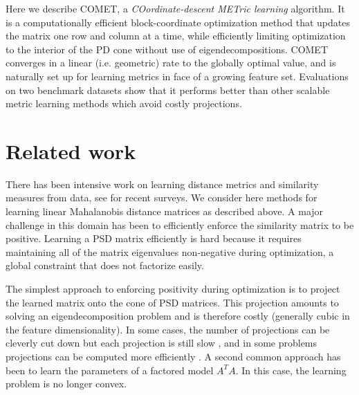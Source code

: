 \documentclass{article}
\begin{document}

Here we describe COMET, a {\em{COordinate-descent METric learning}} algorithm. It is a computationally efficient block-coordinate optimization method that updates the matrix one row and column at a time, while efficiently limiting optimization to the interior of the PD cone without use of eigendecompositions. COMET converges in a linear (i.e. geometric) rate to the globally optimal value, and is naturally set up for learning metrics in face of a growing feature set. Evaluations on two benchmark datasets show that it performs better than other scalable metric learning methods which avoid costly projections. 



\section{Related work}
There has been intensive work on learning distance metrics and similarity measures from data, see \citet{bellet2013survey, kulis2012survey} for recent surveys. We consider here methods for learning linear Mahalanobis distance matrices as described above. A major challenge in this domain has been to efficiently enforce the similarity matrix to be positive. Learning a PSD matrix efficiently is hard because it requires maintaining all of the matrix eigenvalues non-negative during optimization, a global constraint that does not factorize easily.

The simplest approach to enforcing positivity during optimization is to project the learned matrix onto the cone of PSD matrices. This projection amounts to solving an eigendecomposition problem and is therefore costly (generally cubic in the feature dimensionality). In some cases, the number of projections can be cleverly cut down but each projection is still slow \cite{qianHD, qian}, and in some problems projections can be computed more efficiently \cite{shalev2004online}. A second common approach has been to learn the parameters of a factored model $A^TA$. In this case, the learning problem is no longer convex. 
\end{document}
